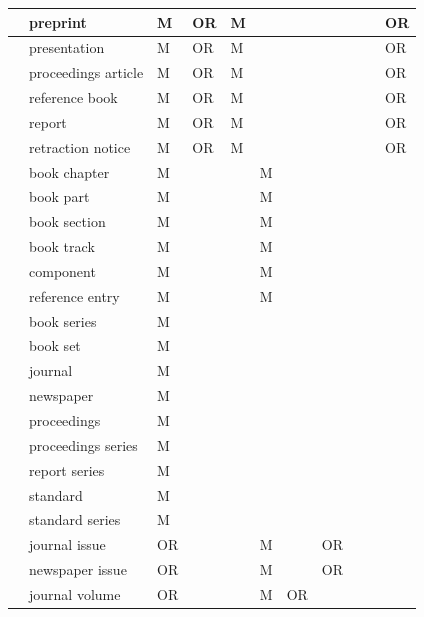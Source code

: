 \documentclass{article}
\begin{document}
\begin{table}[p]
{\begin{tabular}{lllllllllll}
 & preprint                        & M & OR & M &   &   &   &  &  & OR \\ \hline
 & presentation                    & M & OR & M &   &   &   &  &  & OR \\ \hline
 & proceedings article             & M & OR & M &   &   &   &  &  & OR \\ \hline
 & reference book                  & M & OR & M &   &   &   &  &  & OR \\ \hline
 & report                          & M & OR & M &   &   &   &  &  & OR \\ \hline
 & retraction notice               & M & OR & M &   &   &   &  &  & OR \\ \hline
 & book chapter                    & M &   &   & M &   &   &  &  &   \\ \hline
 & book part                       & M &   &   & M &   &   &  &  &   \\ \hline
 & book section                    & M &   &   & M &   &   &  &  &   \\ \hline
 & book track                      & M &   &   & M &   &   &  &  &   \\ \hline
 & component                       & M &   &   & M &   &   &  &  &   \\ \hline
 & reference entry                 & M &   &   & M &   &   &  &  &   \\ \hline
 & book series                     & M &   &   &   &   &   &  &  &   \\ \hline
 & book set                        & M &   &   &   &   &   &  &  &   \\ \hline
 & journal                         & M &   &   &   &   &   &  &  &   \\ \hline
 & newspaper                       & M &   &   &   &   &   &  &  &   \\ \hline
 & proceedings                     & M &   &   &   &   &   &  &  &   \\ \hline
 & proceedings series              & M &   &   &   &   &   &  &  &   \\ \hline
 & report series                   & M &   &   &   &   &   &  &  &   \\ \hline
 & standard                        & M &   &   &   &   &   &  &  &   \\ \hline
 & standard series                 & M &   &   &   &   &   &  &  &   \\ \hline
 & journal issue                   & OR &   &   & M &   & OR &  &  &   \\ \hline
 & newspaper issue                 & OR &   &   & M &   & OR &  &  &   \\ \hline
 & journal volume                  & OR &   &   & M & OR &   &  &  &   \\ \hline
\end{tabular}%
}
\end{table}
\end{document}
